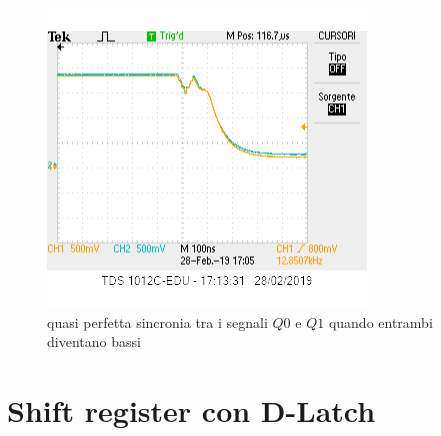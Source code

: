 \documentclass[10pt,a4paper]{article}
\begin{document}
\begin{figure}[h]
			\centering
			\includegraphics[scale=0.85]{Q0Q1sincroni}
			\caption{quasi perfetta sincronia tra i segnali $Q0$ e $Q1$ quando entrambi diventano bassi}
			\label{fig:q0q1}
\end{figure}
\section{Shift register con D-Latch}
\end{document}
